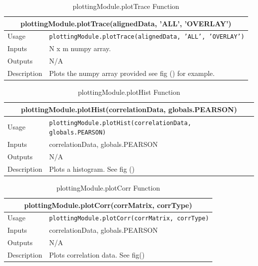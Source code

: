 \documentclass{llncs}
\numberwithin{algorithm}{chapter}
\begin{document}
\begin{table}
\caption{plottingModule.plotTrace Function}
\begin{tabular}{ |p{2cm}||p{11cm}|  }
 \hline
 \multicolumn{2}{|c|}{\cellcolor{teal}\textbf{plottingModule.plotTrace(alignedData, 'ALL', 'OVERLAY')}} \\
 \hline
 Usage & \texttt{plottingModule.plotTrace(alignedData, 'ALL', 'OVERLAY')}\\ \hline
 Inputs &  N x m numpy array.  \\ \hline
 Outputs & N/A \\ \hline
 Description & Plots the numpy array provided see fig () for example. \\ \hline
\end{tabular}
\end{table}

\begin{table}
\caption{plottingModule.plotHist Function}
\begin{tabular}{ |p{2cm}||p{11cm}|  }
 \hline
 \multicolumn{2}{|c|}{\cellcolor{teal}\textbf{plottingModule.plotHist(correlationData, globals.PEARSON)}} \\
 \hline
 Usage & \texttt{plottingModule.plotHist(correlationData, globals.PEARSON)}\\ \hline
 Inputs &  correlationData, globals.PEARSON  \\ \hline
 Outputs & N/A \\ \hline
 Description & Plots a histogram. See fig ()
 \\ \hline
\end{tabular}
\end{table}

\begin{table}
\caption{plottingModule.plotCorr Function}
\begin{tabular}{ |p{2cm}||p{11cm}|  }
 \hline
 \multicolumn{2}{|c|}{\cellcolor{teal}\textbf{plottingModule.plotCorr(corrMatrix, corrType)}} \\
 \hline
 Usage & \texttt{plottingModule.plotCorr(corrMatrix, corrType)}\\ \hline
 Inputs & correlationData, globals.PEARSON  \\ \hline
 Outputs & N/A \\ \hline
 Description & Plots correlation data. See fig() \\ \hline
\end{tabular}
\end{table}
\end{document}

